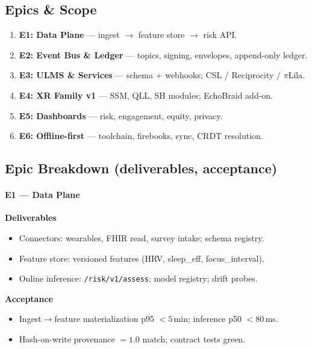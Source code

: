 \documentclass[11pt]{article}
\theoremstyle{plain}
\begin{document}
\subsection{Epics \& Scope}
\begin{enumerate}
  \item \textbf{E1: Data Plane} — ingest $\rightarrow$ feature store $\rightarrow$ risk API.
  \item \textbf{E2: Event Bus \& Ledger} — topics, signing, envelopes, append-only ledger.
  \item \textbf{E3: ULMS \& Services} — schema + webhooks; CSL / Reciprocity / $\pi$Līla.
  \item \textbf{E4: XR Family v1} — SSM, QLL, SH modules; EchoBraid add-on.
  \item \textbf{E5: Dashboards} — risk, engagement, equity, privacy.
  \item \textbf{E6: Offline-first} — toolchain, firebooks, sync, CRDT resolution.
\end{enumerate}

\subsection{Epic Breakdown (deliverables, acceptance)}
\paragraph{E1 — Data Plane}
\textbf{Deliverables}
\begin{itemize}
  \item Connectors: wearables, FHIR read, survey intake; schema registry.
  \item Feature store: versioned features (HRV, sleep\_eff, focus\_interval).
  \item Online inference: \texttt{/risk/v1/assess}; model registry; drift probes.
\end{itemize}
\textbf{Acceptance}
\begin{itemize}
  \item Ingest$\rightarrow$feature materialization p95 $<5$\,min; inference p50 $<80$\,ms.
  \item Hash-on-write provenance $=1.0$ match; contract tests green.
\end{itemize}
\end{document}
